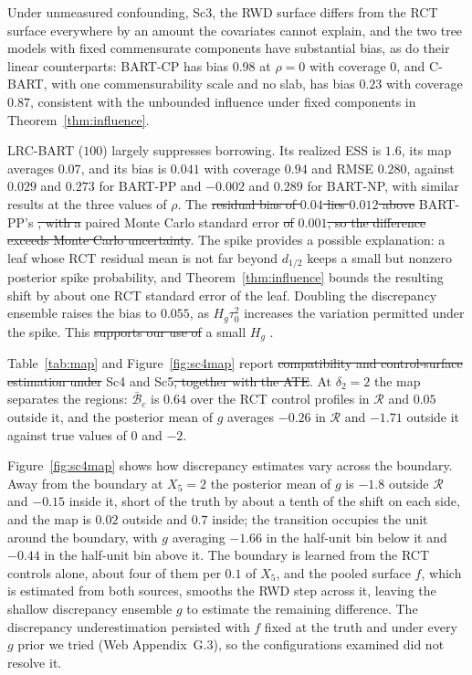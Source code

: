 \documentclass[11pt]{article}
\theoremstyle{definition}
\theoremstyle{plain}
\providecommand{\DIFaddtex}[1]{{\protect\color{blue}\uwave{#1}}} %
\providecommand{\DIFdeltex}[1]{{\protect\color{red}\sout{#1}}}                      %
\providecommand{\DIFaddbegin}{} %
\providecommand{\DIFaddend}{} %
\providecommand{\DIFdelbegin}{} %
\providecommand{\DIFdelend}{} %
\providecommand{\DIFadd}[1]{\texorpdfstring{\DIFaddtex{#1}}{#1}} %
\providecommand{\DIFdel}[1]{\texorpdfstring{\DIFdeltex{#1}}{}} %
\newcommand{\DIFscaledelfig}{0.5}
\newlength{\DIFdelgraphicswidth} %
\newlength{\DIFdelgraphicsheight} %
\newcommand{\DIFaddincludegraphics}[2][]{{\color{blue}\fbox{\DIFOincludegraphics[#1]{#2}}}} %
\newcommand{\DIFdelincludegraphics}[2][]{%
\sbox{\DIFdelgraphicsbox}{\DIFOincludegraphics[#1]{#2}}%
\settoboxwidth{\DIFdelgraphicswidth}{\DIFdelgraphicsbox} %
\settoboxtotalheight{\DIFdelgraphicsheight}{\DIFdelgraphicsbox} %
\scalebox{\DIFscaledelfig}{%
\parbox[b]{\DIFdelgraphicswidth}{\usebox{\DIFdelgraphicsbox}\\[-\baselineskip] \rule{\DIFdelgraphicswidth}{0em}}\llap{\resizebox{\DIFdelgraphicswidth}{\DIFdelgraphicsheight}{%
\setlength{\unitlength}{\DIFdelgraphicswidth}%
\begin{picture}(1,1)%
\thicklines\linethickness{2pt} %
{\color[rgb]{1,0,0}\put(0,0){\framebox(1,1){}}}%
{\color[rgb]{1,0,0}\put(0,0){\line( 1,1){1}}}%
{\color[rgb]{1,0,0}\put(0,1){\line(1,-1){1}}}%
\end{picture}%
}\hspace*{3pt}}} %
} %
\DeclareRobustCommand{\DIFaddbegin}{\DIFOaddbegin \let\includegraphics\DIFaddincludegraphics} %
\DeclareRobustCommand{\DIFaddend}{\DIFOaddend \let\includegraphics\DIFOincludegraphics} %
\DeclareRobustCommand{\DIFdelbegin}{\DIFOdelbegin \let\includegraphics\DIFdelincludegraphics} %
\DeclareRobustCommand{\DIFdelend}{\DIFOaddend \let\includegraphics\DIFOincludegraphics} %
\begin{document}
Under unmeasured confounding, Sc3, the RWD surface differs from the RCT surface everywhere by an amount the covariates cannot explain, and the two tree models with fixed commensurate components have substantial bias, as do their linear counterparts: BART-CP has bias $0.98$ at $\rho=0$ with coverage $0$, and C-BART, with one commensurability scale and no slab, has bias $0.23$ with coverage $0.87$, consistent with the unbounded influence under fixed components in Theorem~\ref{thm:influence}.

LRC-BART ($100$) largely suppresses borrowing. Its realized ESS is $1.6$, its map averages $0.07$, and its bias is $0.041$ with coverage $0.94$ and RMSE $0.280$, against $0.029$ and $0.273$ for BART-PP and $-0.002$ and $0.289$ for BART-NP, with similar results at the three values of $\rho$. The \DIFdelbegin \DIFdel{residual bias of $0.04$ lies $0.012$ above }\DIFdelend \DIFaddbegin \DIFadd{$0.04$ residual bias exceeds }\DIFaddend BART-PP's \DIFdelbegin \DIFdel{, with a }\DIFdelend \DIFaddbegin \DIFadd{by $0.012$ (}\DIFaddend paired Monte Carlo standard error \DIFdelbegin \DIFdel{of }\DIFdelend $0.001$\DIFdelbegin \DIFdel{, so the difference exceeds Monte Carlo uncertainty}\DIFdelend \DIFaddbegin \DIFadd{)}\DIFaddend . The spike provides a possible explanation: a leaf whose RCT residual mean is not far beyond $d_{1/2}$ keeps a small but nonzero posterior spike probability, and Theorem~\ref{thm:influence} bounds the resulting shift by about one RCT standard error of the leaf. Doubling the discrepancy ensemble raises the bias to $0.055$, as $H_g\tau_0^2$ increases the variation permitted under the spike. This \DIFdelbegin \DIFdel{supports our use of }\DIFdelend \DIFaddbegin \DIFadd{favors }\DIFaddend a small $H_g$ \DIFaddbegin \DIFadd{in this study}\DIFaddend .

Table~\ref{tab:map} and Figure~\ref{fig:sc4map} report \DIFdelbegin \DIFdel{compatibility and control-surface estimation under }\DIFdelend Sc4 and Sc5\DIFdelbegin \DIFdel{, together with the ATE}\DIFdelend . At $\delta_2=2$ the map separates the regions: $\bar{\mathcal B}_c$ is $0.64$ over the RCT control profiles in $\mathcal R$ and $0.05$ outside it, and the posterior mean of $g$ averages $-0.26$ in $\mathcal R$ and $-1.71$ outside it against true values of $0$ and $-2$.

Figure~\ref{fig:sc4map} shows how discrepancy estimates vary across the boundary. Away from the boundary at $X_5=2$ the posterior mean of $g$ is $-1.8$ outside $\mathcal R$ and $-0.15$ inside it, short of the truth by about a tenth of the shift on each side, and the map is $0.02$ outside and $0.7$ inside; the transition occupies the unit around the boundary, with $g$ averaging $-1.66$ in the half-unit bin below it and $-0.44$ in the half-unit bin above it. The boundary is learned from the RCT controls alone, about four of them per $0.1$ of $X_5$, and the pooled surface $f$, which is estimated from both sources, smooths the RWD step across it, leaving the shallow discrepancy ensemble $g$ to estimate the remaining difference. The discrepancy underestimation persisted with $f$ fixed at the truth and under every $g$ prior we tried (Web Appendix~G.3), so the configurations examined did not resolve it.
\end{document}
